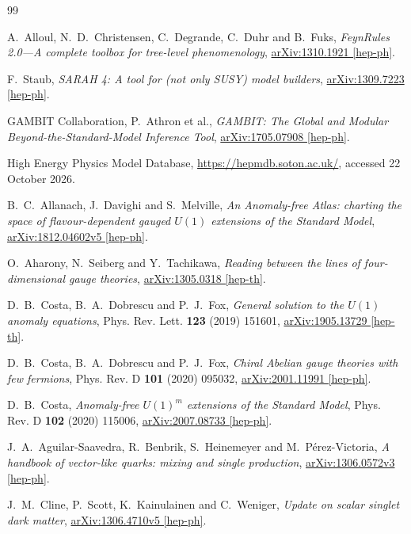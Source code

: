 \begin{thebibliography}{99}

A.~Alloul, N.~D.~Christensen, C.~Degrande, C.~Duhr and B.~Fuks,
\emph{FeynRules 2.0---A complete toolbox for tree-level phenomenology},
\href{https://arxiv.org/abs/1310.1921}{arXiv:1310.1921 [hep-ph]}.

F.~Staub,
\emph{SARAH 4: A tool for (not only SUSY) model builders},
\href{https://arxiv.org/abs/1309.7223}{arXiv:1309.7223 [hep-ph]}.

GAMBIT Collaboration, P.~Athron et al.,
\emph{GAMBIT: The Global and Modular Beyond-the-Standard-Model Inference Tool},
\href{https://arxiv.org/abs/1705.07908}{arXiv:1705.07908 [hep-ph]}.

High Energy Physics Model Database,
\url{https://hepmdb.soton.ac.uk/}, accessed 22 October 2026.

B.~C.~Allanach, J.~Davighi and S.~Melville,
\emph{An Anomaly-free Atlas: charting the space of flavour-dependent gauged $U(1)$ extensions of the Standard Model},
\href{https://arxiv.org/abs/1812.04602v5}{arXiv:1812.04602v5 [hep-ph]}.

O.~Aharony, N.~Seiberg and Y.~Tachikawa,
\emph{Reading between the lines of four-dimensional gauge theories},
\href{https://arxiv.org/abs/1305.0318}{arXiv:1305.0318 [hep-th]}.

D.~B.~Costa, B.~A.~Dobrescu and P.~J.~Fox,
\emph{General solution to the $U(1)$ anomaly equations},
Phys. Rev. Lett. \textbf{123} (2019) 151601,
\href{https://arxiv.org/abs/1905.13729}{arXiv:1905.13729 [hep-th]}.

D.~B.~Costa, B.~A.~Dobrescu and P.~J.~Fox,
\emph{Chiral Abelian gauge theories with few fermions},
Phys. Rev. D \textbf{101} (2020) 095032,
\href{https://arxiv.org/abs/2001.11991}{arXiv:2001.11991 [hep-ph]}.

D.~B.~Costa,
\emph{Anomaly-free $U(1)^m$ extensions of the Standard Model},
Phys. Rev. D \textbf{102} (2020) 115006,
\href{https://arxiv.org/abs/2007.08733}{arXiv:2007.08733 [hep-ph]}.

J.~A.~Aguilar-Saavedra, R.~Benbrik, S.~Heinemeyer and M.~P\'erez-Victoria,
\emph{A handbook of vector-like quarks: mixing and single production},
\href{https://arxiv.org/abs/1306.0572v3}{arXiv:1306.0572v3 [hep-ph]}.

J.~M.~Cline, P.~Scott, K.~Kainulainen and C.~Weniger,
\emph{Update on scalar singlet dark matter},
\href{https://arxiv.org/abs/1306.4710v5}{arXiv:1306.4710v5 [hep-ph]}.


\end{thebibliography}
